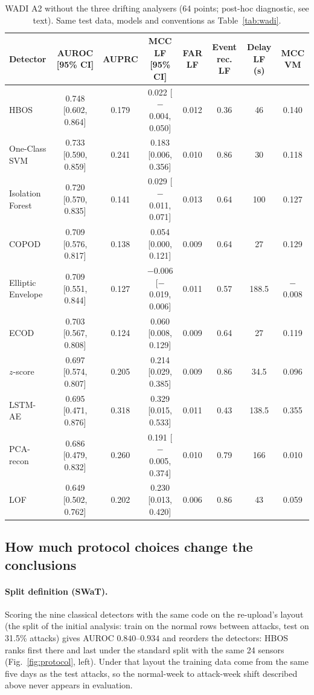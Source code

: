 \documentclass[11pt]{article}
\begin{document}
\begin{table}[t]
\centering\small
\caption{WADI A2 without the three drifting analysers (64 points; post-hoc diagnostic, see text). Same test data, models and conventions as Table~\ref{tab:wadi}.}
\label{tab:wadiex}
\begin{tabular}{lccccccc}
\toprule
Detector & AUROC [95\% CI] & AUPRC & MCC LF [95\% CI] & FAR LF & Event rec. LF & Delay LF (s) & MCC VM \\
\midrule
HBOS & 0.748 [0.602, 0.864] & 0.179 & 0.022 [$-$0.004, 0.050] & 0.012 & 0.36 & 46 & 0.140 \\
One-Class SVM & 0.733 [0.590, 0.859] & 0.241 & 0.183 [0.006, 0.356] & 0.010 & 0.86 & 30 & 0.118 \\
Isolation Forest & 0.720 [0.570, 0.835] & 0.141 & 0.029 [$-$0.011, 0.071] & 0.013 & 0.64 & 100 & 0.127 \\
COPOD & 0.709 [0.576, 0.817] & 0.138 & 0.054 [0.000, 0.121] & 0.009 & 0.64 & 27 & 0.129 \\
Elliptic Envelope & 0.709 [0.551, 0.844] & 0.127 & $-$0.006 [$-$0.019, 0.006] & 0.011 & 0.57 & 188.5 & $-$0.008 \\
ECOD & 0.703 [0.567, 0.808] & 0.124 & 0.060 [0.008, 0.129] & 0.009 & 0.64 & 27 & 0.119 \\
$z$-score & 0.697 [0.574, 0.807] & 0.205 & 0.214 [0.029, 0.385] & 0.009 & 0.86 & 34.5 & 0.096 \\
LSTM-AE & 0.695 [0.471, 0.876] & 0.318 & 0.329 [0.015, 0.533] & 0.011 & 0.43 & 138.5 & 0.355 \\
PCA-recon & 0.686 [0.479, 0.832] & 0.260 & 0.191 [$-$0.005, 0.374] & 0.010 & 0.79 & 166 & 0.010 \\
LOF & 0.649 [0.502, 0.762] & 0.202 & 0.230 [0.013, 0.420] & 0.006 & 0.86 & 43 & 0.059 \\
\bottomrule
\end{tabular}
\end{table}

\subsection{How much protocol choices change the conclusions}
\label{sec:protocol}

\paragraph{Split definition (SWaT).} Scoring the nine classical detectors with the same
code on the re-upload's layout (the split of the initial analysis: train on the
normal rows between attacks, test on 31.5\% attacks) gives AUROC $0.840$--$0.934$
and reorders the detectors: HBOS ranks first there and last under the standard
split with the same 24 sensors (Fig.~\ref{fig:protocol}, left). Under that layout the training data come
from the same five days as the test attacks, so the normal-week to attack-week
shift described above never appears in evaluation.
\end{document}
